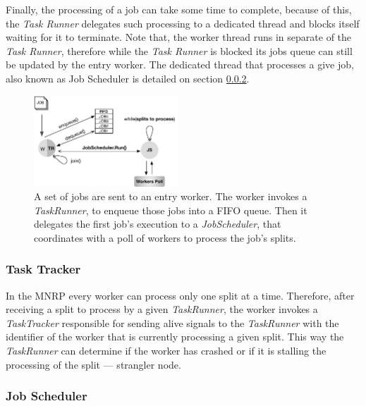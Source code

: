 \documentclass[times, 10pt,twocolumn]{article}
\begin{document}
            Finally, the processing of a job can take some time to complete, because of this, the \emph{Task Runner} delegates such processing to a dedicated thread and blocks itself waiting for it to terminate. Note that, the worker thread runs in separate of the \emph{Task Runner}, therefore while the \emph{Task Runner} is blocked its jobs queue can still be updated by the entry worker. The dedicated thread that processes a give job, also known as Job Scheduler is detailed on section \ref{job-scheduler}.

            \begin{figure}[h]
                \begin{center}
                    \includegraphics[width=0.48\textwidth]{pics/taskrunner-example.pdf}
                    \caption{A set of jobs are sent to an entry worker. The worker invokes a \textit{TaskRunner}, to enqueue those jobs into a FIFO queue. Then it delegates the first job's execution to a \textit{JobScheduler}, that coordinates with a poll of workers to process the job's splits.}
                    \label{fig:mnr-taskrunner-example}
                \end{center}
            \end{figure}

            \subsubsection{Task Tracker}

           In the \ac{MNRP} every worker can process only one split at a time. Therefore, after receiving a split to process by a given \textit{TaskRunner}, the worker invokes a \textit{TaskTracker} responsible for sending alive signals to the \textit{TaskRunner} with the identifier of the worker that is currently processing a given split. This way the \textit{TaskRunner} can determine if the worker has crashed or if it is stalling the processing of the split — strangler node.

        	\subsubsection{Job Scheduler}\label{job-scheduler}
\end{document}
